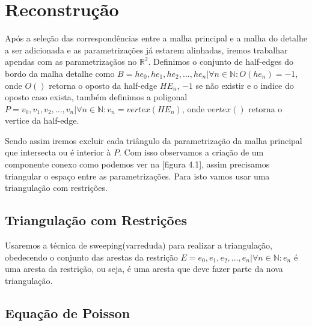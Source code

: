 \section{Reconstrução}
%
Após a seleção das correspondências entre a malha principal e a malha do detalhe a ser
adicionada e as parametrizações já estarem alinhadas, iremos trabalhar apendas com as parametrizaçãos
no $\mathbb{R}^2$. Definimos o conjunto de half-edges do bordo da malha detalhe como 
$B = {he_0, he_1, he_2, \ldots, he_n} | \forall n \in \mathbb{N}: O(he_n) = -1$, onde $O( )$ retorna o oposto da
half-edge $HE_n$, $-1$ se não existir e o indice do oposto caso exista, também definimos a poligonal
$P = {v_0, v_1, v_2, ..., v_n} | \forall n \in \mathbb{N}: v_n = vertex(HE_n)$, onde $vertex( )$ retorna o vertice
da half-edge. 

Sendo assim iremos excluir cada triângulo da parametrização da malha principal que intersecta ou é
interior à $P$. Com isso observamos a criação de um componente conexo como podemos ver na [figura 4.1],
assim precisamos triangular o espaço entre as parametrizações. Para isto vamos usar uma triangulação com
restrições.

\subsection{Triangulação com Restrições}
%
Usaremos a técnica de sweeping(varreduda) para realizar a triangulação, obedecendo o conjunto das
arestas da restrição $E = {e_0, e_1, e_2, \ldots, e_n} | \forall n \in \mathbb{N}: e_n$ é uma aresta da restrição,
ou seja, é uma aresta que deve fazer parte da nova triangulação.

\subsection{Equação de Poisson}